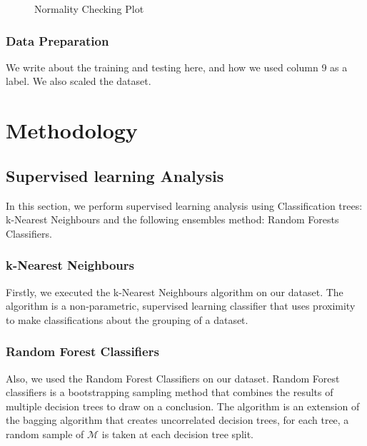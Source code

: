 \documentclass[12pt]{article}
\begin{document}
\begin{enumerate}
\begin{figure}[h!]
		\caption{Normality Checking Plot} 
		
		\label{fig:normalplot} 
		
	\end{figure} 
		
\end{enumerate} 
 

\subsubsection{Data Preparation} 

We write about the training and testing here, and how we used column 9 as a label. We also scaled the dataset.\\

\section{Methodology}
\subsection{Supervised learning Analysis} 
 In this section, we perform supervised learning analysis using Classification trees: k-Nearest Neighbours and the following ensembles method: Random Forests Classifiers.\cite{zhou2012ensemble}
 
 \subsubsection{k-Nearest Neighbours}

 Firstly, we executed the k-Nearest Neighbours algorithm \cite{peterson2009k} on our dataset. The algorithm is a non-parametric, supervised learning classifier that uses proximity to make classifications about the grouping of a dataset.

 \subsubsection{Random Forest Classifiers}
 
 Also, we used the Random Forest Classifiers \cite{zhou2012ensemble} on our dataset. Random Forest classifiers is a bootstrapping sampling method that combines the results of multiple decision trees to draw on a conclusion. The algorithm \cite{Lecture16} is an extension of the bagging algorithm \cite{Lecture16} that creates uncorrelated decision trees, for each tree, a random sample of $\mathcal{M}$ is taken at each decision tree split.
\end{document}
